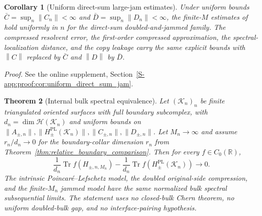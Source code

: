 \documentclass[11pt]{article}
\numberwithin{equation}{section}
\newtheorem{theorem}{Theorem}[section]
\newtheorem{corollary}[theorem]{Corollary}
\theoremstyle{definition}
\theoremstyle{remark}
\newcommand{\proofsuppref}[1]{%
  \par\noindent\emph{Proof.} See the online supplement, Section~\ref{S-#1}.\par\medskip
}
\newcommand{\K}{\mathcal{K}}
\newcommand{\Hil}{\mathcal{H}}
\newcommand{\opnorm}[1]{\left\lVert#1\right\rVert}
\begin{document}
\begin{corollary}[Uniform direct-sum large-jam estimates]\label{cor:uniform_direct_sum_jam}
Under uniform bounds $\bar C=\sup_n\opnorm{C_n}<\infty$ and $\bar D=\sup_n\opnorm{D_n}<\infty$,
the finite-$M$ estimates of
 hold uniformly
in $n$ for the direct-sum doubled-and-jammed family. The compressed resolvent error, the
first-order compressed approximation, the spectral-localization distance, and the copy leakage
carry the same explicit bounds with $\opnorm{C}$ replaced by $\bar C$ and $\opnorm{D}$ by
$\bar D$.
\end{corollary}
\proofsuppref{app:proof:cor:uniform_direct_sum_jam}

\begin{theorem}[Internal bulk spectral equivalence]\label{thm:internal_bulk_spectral_equivalence}
Let $(\K_n)_n$ be finite triangulated oriented surfaces with full boundary subcomplex, with
$d_n=\dim\Hil(\K_n)$ and uniform bounds on $\|A_{\pm,n}\|,\|H^{\mathrm{PL}}_\pm(\K_n)\|,
\|C_{\pm,n}\|,\|D_{\pm,n}\|$. Let $M_n\to\infty$ and assume $r_n/d_n\to0$ for the
boundary-collar dimension $r_n$ from Theorem~\ref{thm:relative_boundary_comparison}. Then for
every $f\in C_0(\mathbb R)$,
\[
\frac1{d_n}\operatorname{Tr} f(H_{\pm,n,M_n})
-
\frac1{d_n}\operatorname{Tr} f\!\left(H^{\mathrm{PL}}_{\pm}(\K_n)\right)
\longrightarrow0.
\]
The intrinsic Poincar\'e--Lefschetz model, the doubled original-side compression, and the
finite-\(M_n\) jammed model have the same normalized bulk spectral subsequential limits. The
statement uses no closed-bulk Chern theorem, no uniform doubled-bulk gap, and no
interface-pairing hypothesis.
\end{theorem}
\end{document}
